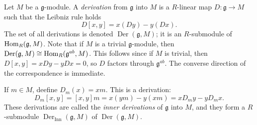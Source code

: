 \begin{definition}\label{7.4.8}
	Let $M$ be a $\mathfrak{g} $-module. A \emph{derivation} from $\mathfrak{g} $ into $M$ is a $R$-linear map $D : \mathfrak{g}  \to M$ such that the Leibniz rule holds
	\[
		D[x,y]=x(Dy)-y(Dx)
	.\]
	The set of all derivations is denoted $\operatorname{Der} (\mathfrak{g} ,M)$; it is an $R$-submodule of $\operatorname{Hom}_R(\mathfrak{g} , M) $. Note that if $M$ is a trivial $\mathfrak{g} $-module, then $\operatorname{Der} (\mathfrak{g} ,M)\cong \operatorname{Hom}_R(\mathfrak{g} ^{ab} , M) $. This follows since if $M$ is trivial, then $D[x,y]=xDy-yDx=0$, so $D$ factors through $\mathfrak{g} ^{ab} $. The converse direction of the correspondence is immediate.
\end{definition}

\begin{example}\label{7.4.9}
	If $m\in M$, deefine $D_m(x)=xm$. This is a derivation:
	\[
		D_m[x,y]=[x,y]m=x(ym)-y(xm)=xD_my-yD_mx
	.\]
	These derivations are called the \emph{inner derivations} of $\mathfrak{g} $ into $M$, and they form a $R$-submodule $\operatorname{Der}_{\mathrm{Inn} } (\mathfrak{g} ,M)$ of $\operatorname{Der} (\mathfrak{g},M)$.
\end{example}

